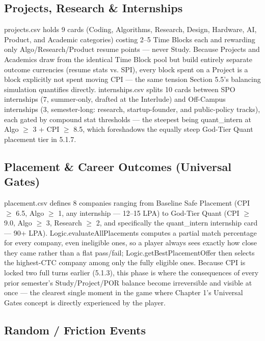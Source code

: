\subsection{Projects, Research & Internships}

projects.csv holds 9 cards (Coding, Algorithms, Research, Design, Hardware, AI, Product, and Academic categories) costing 2--5 Time Blocks each and rewarding only Algo/Research/Product resume points --- never Study. Because Projects and Academics draw from the identical Time Block pool but build entirely separate outcome currencies (resume stats vs. SPI), every block spent on a Project is a block explicitly not spent moving CPI --- the same tension Section 5.5's balancing simulation quantifies directly. internships.csv splits 10 cards between SPO internships (7, summer-only, drafted at the Interlude) and Off-Campus internships (3, semester-long: research, startup-founder, and public-policy tracks), each gated by compound stat thresholds --- the steepest being quant_intern at Algo $\geq$ 3 + CPI $\geq$ 8.5, which foreshadows the equally steep God-Tier Quant placement tier in 5.1.7.

\subsection{Placement & Career Outcomes (Universal Gates)}

placement.csv defines 8 companies ranging from Baseline Safe Placement (CPI $\geq$ 6.5, Algo $\geq$ 1, any internship --- 12--15 LPA) to God-Tier Quant (CPI $\geq$ 9.0, Algo $\geq$ 3, Research $\geq$ 2, and specifically the quant_intern internship card --- 90+ LPA). Logic.evaluateAllPlacements computes a partial match percentage for every company, even ineligible ones, so a player always sees exactly how close they came rather than a flat pass/fail; Logic.getBestPlacementOffer then selects the highest-CTC company among only the fully eligible ones. Because CPI is locked two full turns earlier (5.1.3), this phase is where the consequences of every prior semester's Study/Project/POR balance become irreversible and visible at once --- the clearest single moment in the game where Chapter 1's Universal Gates concept is directly experienced by the player.

\subsection{Random / Friction Events}

